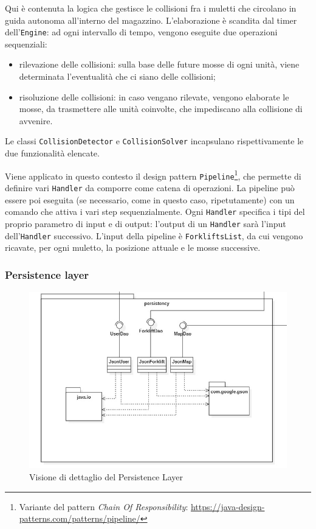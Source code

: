 Qui è contenuta la logica che gestisce le collisioni fra i muletti che circolano in guida autonoma all'interno del magazzino. L'elaborazione è scandita dal timer dell'\texttt{Engine}: ad ogni intervallo di tempo, vengono eseguite due operazioni sequenziali:
\begin{itemize}
	\item rilevazione delle collisioni: sulla base delle future mosse di ogni unità, viene determinata l'eventualità che ci siano delle collisioni;
	\item risoluzione delle collisioni: in caso vengano rilevate, vengono elaborate le mosse, da trasmettere alle unità coinvolte, che impediscano alla collisione di avvenire.
\end{itemize}
Le classi \texttt{CollisionDetector} e \texttt{CollisionSolver} incapsulano rispettivamente le due funzionalità elencate.

Viene applicato in questo contesto il design pattern \texttt{Pipeline}\footnote{Variante del pattern \textit{Chain Of Responsibility}: \url{https://java-design-patterns.com/patterns/pipeline/}}, che permette di definire vari \texttt{Handler} da comporre come catena di operazioni. La pipeline può essere poi eseguita (se necessario, come in questo caso, ripetutamente) con un comando che attiva i vari step sequenzialmente. Ogni \texttt{Handler} specifica i tipi del proprio parametro di input e di output: l'output di un \texttt{Handler} sarà l'input dell'\texttt{Handler} successivo.
L'input della pipeline è \texttt{ForkliftsList}, da cui vengono ricavate, per ogni muletto, la posizione attuale e le mosse successive.



\subsubsection{Persistence layer}

\begin{figure}[H]
	\centering
	\includegraphics[scale=0.50]{res/diagrams/server/server_persistency.jpg}
	\caption{Visione di dettaglio del Persistence Layer}
\end{figure}

